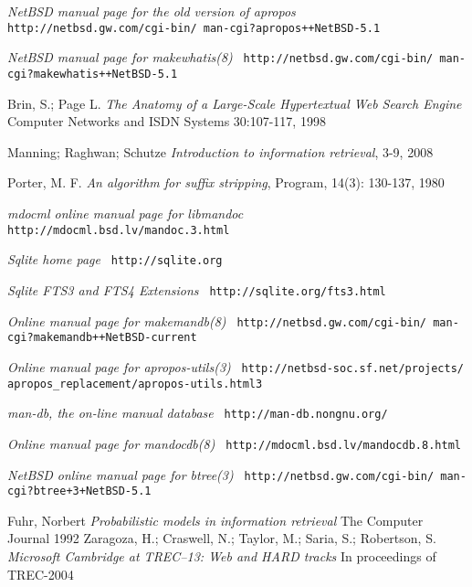 \documentclass[letterpaper,twocolumn,10pt]{article}
\begin{document}
\begin{thebibliography}{20}
\emph{NetBSD manual page for the old version of apropos}
\newline
{\tt
http://netbsd.gw.com/cgi-bin/
man-cgi?apropos++NetBSD-5.1
}

\emph{NetBSD manual page for makewhatis(8)}
\newline
{\tt
http://netbsd.gw.com/cgi-bin/
man-cgi?makewhatis++NetBSD-5.1
}

Brin, S.; Page L.
\emph{The Anatomy of a Large-Scale Hypertextual Web Search Engine}
Computer Networks and ISDN Systems
30:107-117, 1998

Manning; Raghwan; Schutze
\emph{Introduction to information retrieval},
3-9,
2008

Porter, M. F.
\emph{An algorithm for suffix stripping},
Program,
14(3): 130-137,
1980

\emph{mdocml online manual page for
libmandoc}
\newline
{\tt
http://mdocml.bsd.lv/mandoc.3.html
}

\emph{Sqlite home page}
\newline
{\tt
http://sqlite.org
}

\emph{Sqlite FTS3 and FTS4 Extensions}
\newline
{\tt
http://sqlite.org/fts3.html
}

\emph{Online manual page for makemandb(8)}
\newline
{\tt
http://netbsd.gw.com/cgi-bin/
man-cgi?makemandb++NetBSD-current
}

\emph{Online manual page for apropos-utils(3)}
\newline
{\tt
http://netbsd-soc.sf.net/projects/
apropos\_replacement/apropos-utils.html3
}

\emph{man-db, the on-line manual database}
\newline
{\tt
http://man-db.nongnu.org/
}

\emph{Online manual page for mandocdb(8)}
\newline
{\tt
http://mdocml.bsd.lv/mandocdb.8.html
}

\emph{NetBSD online manual page for btree(3)}
\newline
{\tt
http://netbsd.gw.com/cgi-bin/
man-cgi?btree+3+NetBSD-5.1
}

Fuhr, Norbert
\emph{Probabilistic models in information
retrieval}
The Computer Journal
1992
Zaragoza, H.; Craswell, N.; Taylor, M.;
Saria, S.; Robertson, S.
\emph{Microsoft Cambridge at TREC–13: Web
and HARD tracks}
In proceedings of TREC-2004


\end{thebibliography}
\end{document}
